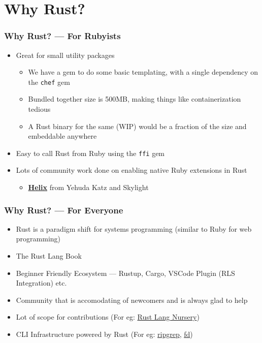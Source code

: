 \section{Why Rust?}
\label{sec:why-rust}


\begin{frame}[fragile]
  \frametitle{Why Rust? --- For Rubyists}
  \begin{itemize}
  \item Great for small utility packages
    \begin{itemize}
    \item We have a gem to do some basic templating, with a single dependency on the {\footnotesize \texttt{chef}} gem
    \item Bundled together size is 500MB, making things like containerization tedious
    \item A Rust binary for the same (WIP) would be a fraction of the size and embeddable anywhere
    \end{itemize}
  \item Easy to call Rust from Ruby using the {\footnotesize \texttt{ffi}} gem
  \item Lots of community work done on enabling native Ruby extensions in Rust
    \begin{itemize}
    \item \href{https://usehelix.com/}{\textbf{Helix}} from Yehuda Katz and Skylight
    \end{itemize}
  \end{itemize}
\end{frame}

\begin{frame}
  \frametitle{Why Rust? --- For Everyone}
  \begin{itemize}
  \item Rust is a paradigm shift for systems programming (similar to Ruby for web programming)
  \item The Rust Lang Book \cite{RustLangEd}
  \item Beginner Friendly Ecosystem --- Rustup, Cargo, VSCode Plugin (RLS Integration) etc.
  \item Community that is accomodating of newcomers and is always glad to help
  \item Lot of scope for contributions (For eg: \href{https://github.com/rust-lang-nursery/}{Rust Lang Nursery})
  \item CLI Infrastructure powered by Rust (For eg: \href{https://github.com/BurntSushi/riggrep/}{ripgrep}, \href{https://github.com/sharkdp/fd/}{fd})
  \end{itemize}
\end{frame}
